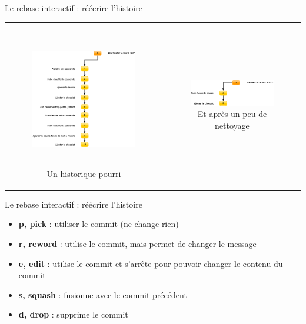 \documentclass[xcolor=x11names,compress]{beamer}
\begin{document}
\begin{frame}{Le rebase interactif : réécrire l'histoire}
	\begin{tabular}{cc}
		\begin{minipage}{0.5\textwidth}
	\begin{figure}[H]
		\includegraphics[height=6cm]{images/3-collaboration/rebaseinteractif.eps}
		\caption{Un historique pourri}
	\end{figure}
\end{minipage}
	&
	\begin{minipage}{0.5\textwidth}
		\pause
	\begin{figure}[H]
		\includegraphics[width=5cm]{images/3-collaboration/rebaseinteractif_2.eps}
		\caption{Et après un peu de nettoyage}
	\end{figure}
\end{minipage}
	\end{tabular}
\end{frame}
\begin{frame}{Le rebase interactif : réécrire l'histoire}
	\begin{itemize}
		\item<1-> \textbf{p, pick} : utiliser le commit (ne change rien)
		\item<2-> \textbf{r, reword} : utilise le commit, mais permet de changer le message
		\item<3-> \textbf{e, edit} : utilise le commit et s'arrête pour pouvoir changer le contenu du commit
		\item<4-> \textbf{s, squash} : fusionne avec le commit précédent
		\item<5-> \textbf{d, drop} : supprime le commit
	\end{itemize}
\end{frame}
\end{document}
